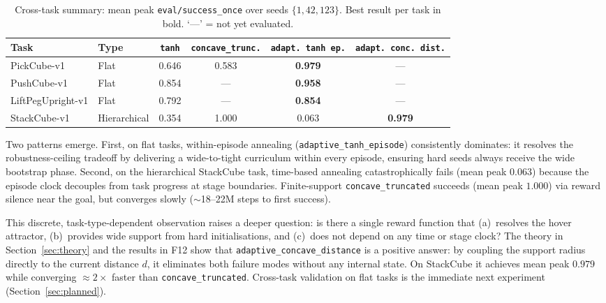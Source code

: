 \documentclass{article}
\begin{document}
\begin{table}[h]
\centering
\small
\caption{Cross-task summary: mean peak \texttt{eval/success\_once} over seeds
$\{1,42,123\}$. Best result per task in bold. `---' = not yet evaluated.}
\label{tab:crosssummary}
\begin{tabular}{@{}llcccc@{}}
\toprule
\textbf{Task} & \textbf{Type} & \textbf{\texttt{tanh}} & \textbf{\texttt{concave\_trunc.}}
    & \textbf{\texttt{adapt.\ tanh\ ep.}} & \textbf{\texttt{adapt.\ conc.\ dist.}} \\
\midrule
PickCube-v1       & Flat         & 0.646 & 0.583 & \textbf{0.979} & --- \\
PushCube-v1       & Flat         & 0.854 & ---   & \textbf{0.958} & --- \\
LiftPegUpright-v1 & Flat         & 0.792 & ---   & \textbf{0.854} & --- \\
StackCube-v1      & Hierarchical & 0.354 & 1.000 & 0.063          & \textbf{0.979} \\
\bottomrule
\end{tabular}
\end{table}

Two patterns emerge. First, on flat tasks, within-episode annealing
(\texttt{adaptive\_tanh\_episode}) consistently dominates: it resolves the
robustness-ceiling tradeoff by delivering a wide-to-tight curriculum within every
episode, ensuring hard seeds always receive the wide bootstrap phase.
Second, on the hierarchical StackCube task, time-based annealing catastrophically
fails (mean peak $0.063$) because the episode clock decouples from task progress at
stage boundaries. Finite-support \texttt{concave\_truncated} succeeds (mean peak
$1.000$) via reward silence near the goal, but converges slowly ($\sim$18--22M steps
to first success).

This discrete, task-type-dependent observation raises a deeper question: is there a
single reward function that (a)~resolves the hover attractor, (b)~provides wide
support from hard initialisations, and (c)~does not depend on any time or stage
clock? The theory in Section~\ref{sec:theory} and the results in F12 show that
\texttt{adaptive\_concave\_distance} is a positive answer: by coupling the support
radius directly to the current distance $d$, it eliminates both failure modes without
any internal state. On StackCube it achieves mean peak $0.979$ while converging
$\approx\!2\times$ faster than \texttt{concave\_truncated}. Cross-task validation on
flat tasks is the immediate next experiment (Section~\ref{sec:planned}).
\end{document}
